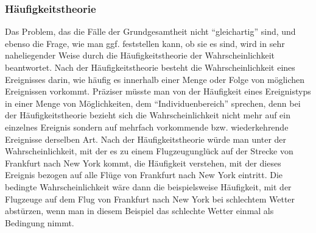 \subsubsection{Häufigkeitstheorie}
\label{Haeufigkeitstheorie}
Das Problem, das die Fälle der Grundgesamtheit nicht "`gleichartig"' sind, und
ebenso die Frage, wie man ggf. feststellen kann, ob sie es sind, wird in sehr
naheliegender Weise durch die Häufigkeitstheorie der
Wahrscheinlichkeit beantwortet. Nach der Häufigkeitstheorie besteht die
Wahrscheinlichkeit eines Ereignisses darin, wie häufig es innerhalb einer Menge
oder Folge von möglichen Ereignissen vorkommt. Präziser müsste man von der
Häufigkeit eines Ereignistyps in einer Menge von Möglichkeiten, dem
"`Individuenbereich"' sprechen, denn bei der Häufigkeitstheorie bezieht sich
die Wahrscheinlichkeit nicht mehr auf ein einzelnes Ereignis sondern auf
mehrfach vorkommende bzw. wiederkehrende Ereignisse derselben Art.
Nach der Häufigkeitstheorie würde man unter der Wahrscheinlichkeit, mit der es
zu einem Flugzeugunglück auf der Strecke von Frankfurt nach New York kommt, die
Häufigkeit verstehen, mit der dieses Ereignis bezogen auf alle Flüge von
Frankfurt nach New York eintritt. Die bedingte Wahrscheinlichkeit wäre dann die
beispielsweise Häufigkeit, mit der Flugzeuge auf dem Flug von Frankfurt nach New
York bei schlechtem Wetter abstürzen, wenn man in diesem Beispiel das schlechte
Wetter einmal als Bedingung nimmt.

